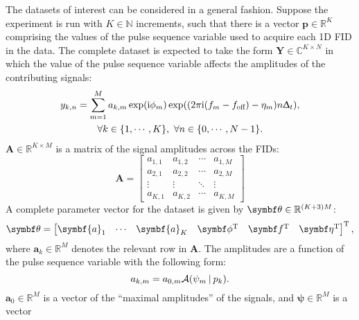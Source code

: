 The datasets of interest can be considered in a general fashion.
Suppose the experiment is run with $K \in \mathbb{N}$ increments,
such that there is a vector  $\symbf{p} \in \mathbb{R}^K$ comprising the
values of the pulse sequence variable used to acquire each \ac{1D} \ac{FID} in
the data.  The complete dataset is expected to take the form $\symbf{Y} \in
\mathbb{C}^{K \times N}$ in which the value of the pulse sequence variable
affects the amplitudes of the contributing signals:
\begin{equation}
    \begin{gathered}
        y_{k,n} = \sum_{m=1}^{M} a_{k,m} \exp(\mathrm{i} \phi_m)
        \exp((2 \pi \mathrm{i} (f_m - f_{\text{off}}) - \eta_m) n \Updelta_t),\\
        \forall k \in \lbrace 1, \cdots, K \rbrace,\ \forall n \in \lbrace 0,
        \cdots, N-1 \rbrace.
    \end{gathered}
\end{equation}
$\symbf{A} \in \mathbb{R}^{K \times M}$ is a matrix of the signal amplitudes
across the \acp{FID}:
\begin{equation}
    \symbf{A} =
    \begin{bmatrix}
        a_{1,1} & a_{1,2} & \cdots & a_{1,M}\\
        a_{2,1} & a_{2,2} & \cdots & a_{2,M}\\
        \vdots & \vdots & \ddots & \vdots\\
        a_{K,1} & a_{K,2} & \cdots & a_{K,M}
    \end{bmatrix}
\end{equation}
A complete parameter vector for the dataset is given by $\bth \in
\mathbb{R}^{(K + 3)M}$:
\begin{equation}
    \bth =
    \begin{bmatrix}
        \symbf{a}_1 & \cdots & \symbf{a}_K & \bdphi\T & \bdf\T & \bdeta\T
    \end{bmatrix}\T,
\end{equation}
where $\symbf{a}_k \in \mathbb{R}^M$ denotes the relevant row in $\symbf{A}$.
The amplitudes are a function of the pulse sequence variable with the following
form:
\begin{equation}
    a_{k,m} = a_{0,m} \mathcal{A} (\psi_m \hspace*{2pt} | \hspace*{2pt} p_k).
\end{equation}
$\symbf{a}_0 \in \mathbb{R}^{M}$ is a vector of the ``maximal
amplitudes'' of the signals, and $\symbf{\psi} \in \mathbb{R}^M$ is a vector
